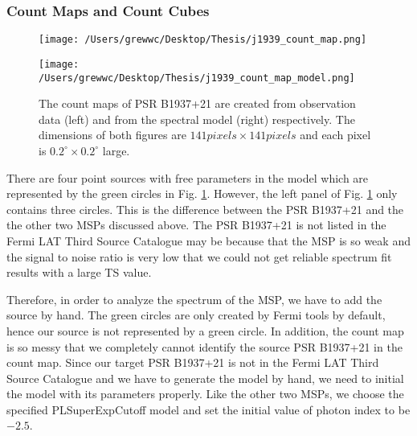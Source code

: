 \documentclass[12pt]{report}
\begin{document}
          \subsubsection{Count Maps and Count Cubes}
          \begin{figure}[!ht]
            \begin{center}
            \begin{minipage}{0.45\textwidth}
              \begin{center} 
                \texttt{[image: /Users/grewwc/Desktop/Thesis/j1939\_count\_map.png]}
              \end{center}
            \end{minipage}
            \begin{minipage}{0.45\textwidth}
              \begin{center}
                \texttt{[image: /Users/grewwc/Desktop/Thesis/j1939\_count\_map\_model.png]}
              \end{center}
            \end{minipage}
          \end{center}
 
          \caption{The count maps of PSR B1937+21 are created from observation 
            data (\textsf{left}) and from the spectral model (\textsf{right}) respectively. 
            The dimensions of both figures are $141 pixels \times 141 pixels$ and each pixel is 
            $0.2^{\circ}\times0.2^{\circ}$ large.}
            \label{fig: j1939_count_map}
          \end{figure}
          \vspace{1cm}

          There are four point sources with free parameters in the model which are represented by the green 
          circles in Fig. \ref{fig: j1939_count_map}.
          However, the left panel of Fig. \ref{fig: j1939_count_map} only contains three circles.
          This is the difference between the PSR B1937+21 and the the other two MSPs discussed 
          above. The PSR B1937+21 is not listed in the Fermi LAT Third Source Catalogue may be because that 
          the MSP is so weak and the signal to noise ratio is very low 
          that we could not get reliable spectrum fit results with a large TS value. 

          Therefore, in order to analyze the spectrum of the MSP, we have to add the source 
          by hand. The green circles are only created by Fermi tools by default, hence our source is 
          not represented by a green circle. In addition, the count map is so messy that we completely 
          cannot identify the source PSR B1937+21 in the count map. 
          Since our target PSR B1937+21 is not in the Fermi LAT Third Source Catalogue and 
          we have to generate the model by hand, we need to initial the model with its parameters properly.
          Like the other two MSPs, we choose the specified PLSuperExpCutoff model and set the initial value 
          of photon index to be $-2.5$.
\end{document}

